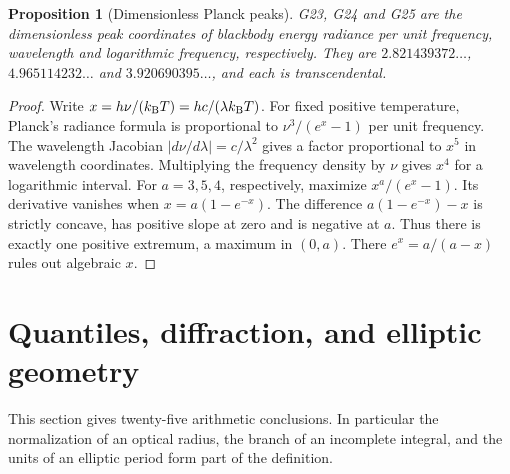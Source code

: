 \documentclass[11pt,a4paper]{article}
\newtheorem{proposition}[theorem]{Proposition}
\theoremstyle{definition}
\theoremstyle{remark}
\begin{document}
\par\hypertarget{cat-G23}{}\label{page:G23}\hypertarget{cat-G24}{}\label{page:G24}\hypertarget{cat-G25}{}\label{page:G25}
\begin{proposition}[Dimensionless Planck peaks]\label{prop:gplanck}
G23, G24 and G25 are the dimensionless peak coordinates of blackbody
energy radiance per unit frequency, wavelength and logarithmic frequency,
respectively. They are $2.821439372\ldots$, $4.965114232\ldots$ and
$3.920690395\ldots$, and each is transcendental.
\end{proposition}
\begin{proof}
Write $x=h\nu/(k_{\rm B}T)=hc/(\lambda k_{\rm B}T)$. For fixed positive
temperature, Planck's radiance formula is proportional to
$\nu^3/(e^x-1)$ per unit frequency. The wavelength Jacobian
$|d\nu/d\lambda|=c/\lambda^2$ gives a factor proportional to $x^5$ in
wavelength coordinates. Multiplying the frequency density by $\nu$ gives
$x^4$ for a logarithmic interval. For $a=3,5,4$, respectively, maximize
$x^a/(e^x-1)$. Its derivative vanishes when $x=a(1-e^{-x})$.
The difference $a(1-e^{-x})-x$ is strictly concave, has positive slope at
zero and is negative at $a$. Thus there is exactly one positive extremum,
a maximum in $(0,a)$. There $e^x=a/(a-x)$ rules out algebraic $x$.
\end{proof}


\section{Quantiles, diffraction, and elliptic geometry}
\label{sec:analytic}
This section gives twenty-five arithmetic conclusions. In particular the
normalization of an optical radius, the branch of an incomplete integral,
and the units of an elliptic period form part of the definition.
\end{document}
